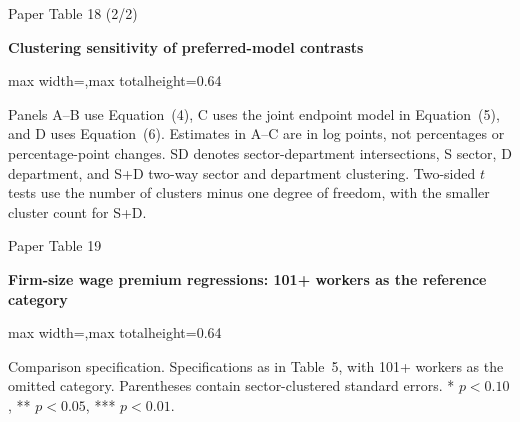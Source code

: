 \begin{frame}{Paper Table 18 (2/2)}
\begin{minipage}{\textwidth}\small\textbf{Clustering sensitivity of preferred-model contrasts}\end{minipage}\par\vspace{0.15cm}
\centering\begingroup\fontsize{8.5}{10}\selectfont
\setlength{\tabcolsep}{4pt}\renewcommand{\arraystretch}{1.06}
\begin{adjustbox}{max width=\textwidth,max totalheight=0.64\textheight}

\end{adjustbox}\endgroup\par\vspace{0.10cm}
{\fontsize{6.5}{7.5}\selectfont\raggedright Panels A--B use Equation~(4), C uses the joint endpoint model in Equation~(5), and D uses Equation~(6). Estimates in A--C are in log points, not percentages or percentage-point changes. SD denotes sector-department intersections, S sector, D department, and S+D two-way sector and department clustering. Two-sided $t$ tests use the number of clusters minus one degree of freedom, with the smaller cluster count for S+D.\par}
\end{frame}

\begin{frame}{Paper Table 19}
\begin{minipage}{\textwidth}\small\textbf{Firm-size wage premium regressions: 101+ workers as the reference category}\end{minipage}\par\vspace{0.15cm}
\centering\begingroup\fontsize{8.5}{10}\selectfont
\setlength{\tabcolsep}{4pt}\renewcommand{\arraystretch}{1.06}
\begin{adjustbox}{max width=\textwidth,max totalheight=0.64\textheight}

\end{adjustbox}\endgroup\par\vspace{0.10cm}
{\fontsize{6.5}{7.5}\selectfont\raggedright Comparison specification. Specifications as in Table~5, with 101+ workers as the omitted category. Parentheses contain sector-clustered standard errors. * $p<0.10$, ** $p<0.05$, *** $p<0.01$.\par}
\end{frame}

